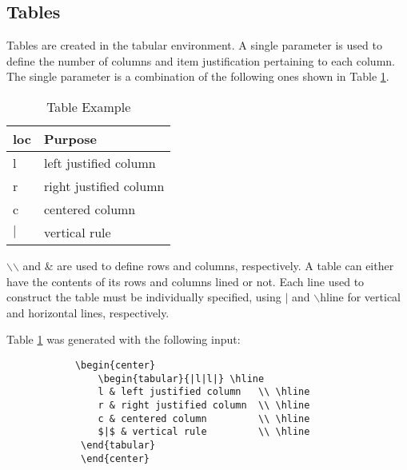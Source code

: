 \subsection{Tables}
 Tables are created in the tabular environment. A single parameter is used to define the number of columns and item justification pertaining to each column.  The single parameter is a combination of the following ones shown in Table \ref{tb:example1}.
 \\
\begin{table}
 \begin{center}
 \begin{tabular}{|l|l|} \hline
    \textbf{loc}    &   \textbf{Purpose}        \\ \hline
    l               &   left justified column   \\ \hline
    r               &   right justified column  \\ \hline
    c               &   centered column         \\ \hline
    $|$             &   vertical rule           \\ \hline
 \end{tabular}
 \end{center}
 \caption{Table Example}
 \label{tb:example1}
\end{table}
$\backslash$$\backslash$ and \& are used to define rows and columns, respectively.  A table can either have the contents of its rows and columns lined or not.  Each line used to construct the table must be individually specified, using $|$ and $\backslash$hline for vertical and horizontal lines, respectively.

Table \ref{tb:example1} was generated with the following input:

\begin{verbatim}
            \begin{center}
                \begin{tabular}{|l|l|} \hline
                l & left justified column   \\ \hline
                r & right justified column  \\ \hline
                c & centered column         \\ \hline
                $|$ & vertical rule         \\ \hline
             \end{tabular}
             \end{center}
\end{verbatim}

